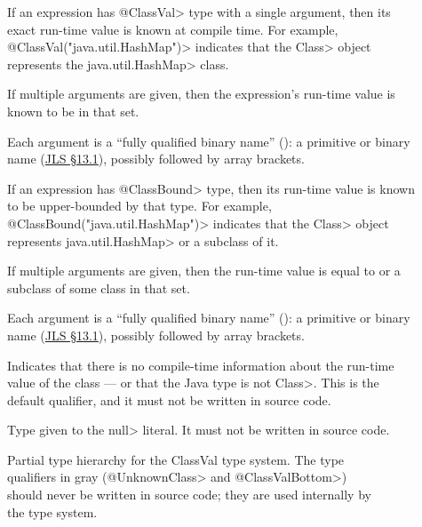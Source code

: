 \begin{description}
\item[]
If an expression has \<@ClassVal> type with a single argument,
then its exact run-time value is known at compile time.
For example, \<@ClassVal("java.util.HashMap")>
indicates that the \<Class> object represents the \<java.util.HashMap> class.

If multiple arguments are given, then the expression's run-time value is
known to be in that set.

Each argument is a ``fully qualified binary name''
():  a primitive or binary name
(\href{https://docs.oracle.com/javase/specs/jls/se25/html/jls-13.html#jls-13.1}{JLS
  \S 13.1}), possibly followed by array brackets.

\item[]
If an expression has \<@ClassBound> type, then its run-time value is known
to be upper-bounded by that type.
For example,
\<@ClassBound("java.util.HashMap")> indicates that the \<Class> object
represents \<java.util.HashMap> or a subclass of it.

If multiple arguments are given, then the run-time value is equal to or a
subclass of some class in that set.

Each argument is a ``fully qualified binary name''
():  a primitive or binary name
(\href{https://docs.oracle.com/javase/specs/jls/se25/html/jls-13.html#jls-13.1}{JLS
  \S 13.1}), possibly followed by array brackets.

\item[] Indicates that there is no
  compile-time information about the run-time value of the class --- or
  that the Java type is not \<Class>.
  This is the default qualifier, and it must not be written in source code.

\item[] Type given to the \<null> literal.
  It must not be written in source code.
\end{description}
\begin{figure}
\caption{Partial type hierarchy for the ClassVal type system. The type qualifiers in gray (\<@UnknownClass>
and \<@ClassValBottom>) should never be written in source code; they are used internally by the type system.}
\label{fig-classval-hierarchy}
\end{figure}

